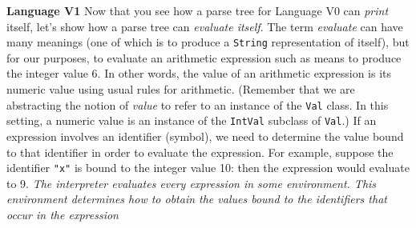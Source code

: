 \begin{minipage}[t]{\sw}
\slidenumber
\LARGE
{\bf Language V1}\exx
Now that you see how a parse tree
for Language V0 can {\em print} itself,
let's show how a parse tree can {\em evaluate itself}.\exx
The term {\em evaluate} can have many meanings
(one of which is to produce a \verb'String' representation of itself),
but for our purposes,
to evaluate an arithmetic expression such
as 
means to produce the integer value 6.
In other words, the value of an arithmetic expression
is its numeric value using usual rules for arithmetic.\exx
(Remember that we are abstracting the notion of {\em value}
to refer to an instance of the \verb'Val' class.
In this setting, a numeric value is an instance
of the \verb'IntVal' subclass of \verb'Val'.)\exx
If an expression involves an identifier (symbol),
we need to determine the value bound to that identifier
in order to evaluate the expression.
For example, suppose the identifier \verb'"x"' is bound
to the integer value 10:
then the expression 
would evaluate to 9.\exx
{\em The interpreter evaluates every expression in some environment.
This environment determines how to obtain
the values bound to the identifiers that occur in the expression}\exx
\end{minipage}
\clearpage
